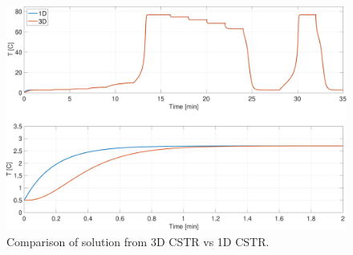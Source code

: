 \begin{figure}[h]
    \centering
    \includegraphics[width=\textwidth]{plots/6_5_both.pdf}
    \caption{Comparison of solution from 3D CSTR vs 1D CSTR.}
    \label{fig:6_5_both}
\end{figure}


